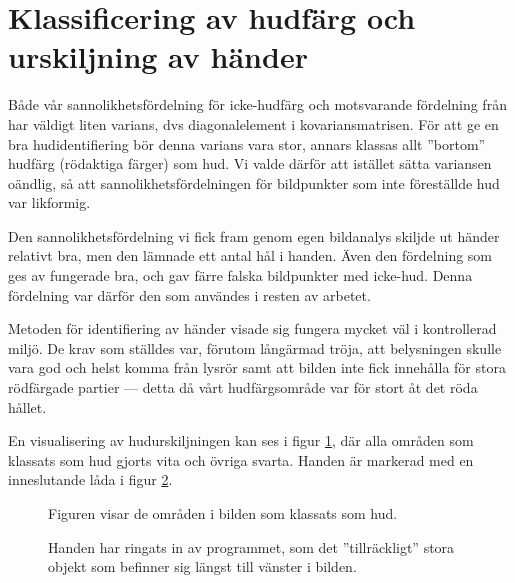\documentclass[../rapport_MVEX01-11-05]{subfiles}
\begin{document}
\section{Klassificering av hudfärg och urskiljning av händer}
Både vår sannolikhetsfördelning för icke-hudfärg och motsvarande
fördelning från  har väldigt liten varians,
dvs diagonalelement i kovariansmatrisen. För att ge en bra
hudidentifiering bör denna varians vara stor, annars klassas allt
''bortom'' hudfärg (rödaktiga färger) som hud. Vi valde därför att
istället sätta variansen oändlig, så att sannolikhetsfördelningen för
bildpunkter som inte föreställde hud var likformig.

Den sannolikhetsfördelning vi fick fram genom egen bildanalys skiljde
ut händer relativt bra, men den lämnade ett antal hål i handen. Även
den fördelning som ges av  fungerade bra, och
gav färre falska bildpunkter med icke-hud. Denna fördelning var därför den som
användes i resten av arbetet. 

Metoden för identifiering av händer visade sig fungera mycket väl i
kontrollerad miljö. De krav som ställdes var, förutom långärmad
tröja, att belysningen skulle vara god och helst komma från lysrör
samt att bilden inte fick innehålla för stora rödfärgade partier --- detta
då vårt hudfärgsområde var för stort åt det röda hållet. 

En visualisering av hudurskiljningen kan ses i figur
\ref{fig:hudklassificering}, där alla områden som klassats som hud
gjorts vita och övriga svarta. Handen är markerad med en inneslutande
låda i figur \ref{fig:boundingbox}.

\begin{figure}
	  \centering
		\caption{Figuren visar de områden i bilden som
                  klassats som hud.}
									\label{fig:hudklassificering}
\end{figure}

\begin{figure}
	  \centering
		\caption{Handen har ringats in av programmet, som det
                  ''tillräckligt'' stora objekt som befinner sig
                  längst till vänster i bilden.}
									\label{fig:boundingbox}
\end{figure}
\end{document}
